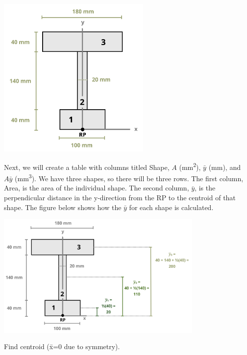 \documentclass[
  letterpaper,
  DIV=11,
  numbers=noendperiod]{scrreprt}
\theoremstyle{definition}
\theoremstyle{remark}
\begin{document}
\begin{tcolorbox}
\begin{tcolorbox}
\begin{center}
\includegraphics[width=2.95833in,height=\textheight]{images/CH 8 PNGs/example 8.2 part 2.png}
\end{center}

Next, we will create a table with columns titled Shape, \(A\)
(mm\textsuperscript{2}), \(\bar{y}\) (mm), and \(A\bar{y}\)
(mm\textsuperscript{3}). We have three shapes, so there will be three
rows. The first column, Area, is the area of the individual shape. The
second column, \(\bar{y}\), is the perpendicular distance in the
y-direction from the RP to the centroid of that shape. The figure below
shows how the \(\bar{y}\) for each shape is calculated.

\begin{center}
\includegraphics[width=4in,height=\textheight]{images/CH 8 PNGs/example 8.2 part 3.png}
\end{center}

Find centroid (x̄=0 due to symmetry).


\end{tcolorbox}
\end{tcolorbox}
\end{document}
